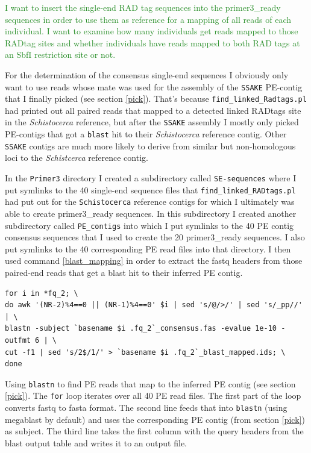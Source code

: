 \documentclass{article}\usepackage[]{graphicx}\usepackage[]{color}
\newcommand{\roger}[1]{ \textcolor[named]{ForestGreen}{#1} }
\begin{document}
\roger{I want to insert the single-end RAD tag sequences into the primer3\_ready sequences in order to use them as reference for a mapping of all reads of each individual. I want to examine how many individuals get reads mapped to those RADtag sites and whether individuals have reads mapped to both RAD tags at an SbfI restriction site or not. }

For the determination of the consensus single-end sequences I obviously only want to use reads whose mate was used for the assembly of the \texttt{SSAKE} PE-contig that I finally picked (see section \ref{pick}). That's because \texttt{find\_linked\_Radtags.pl} had printed out all paired reads that mapped to a detected linked RADtags site in the \textit{Schistocerca} reference, but after the \texttt{SSAKE} assembly I mostly only picked PE-contigs that got a \texttt{blast} hit to their \textit{Schistocerca} reference contig. Other \texttt{SSAKE} contigs are much more likely to derive from similar but non-homologous loci to the \textit{Schistcerca} reference contig.

In the \texttt{Primer3} directory I created a subdirectory called \texttt{SE-sequences} where I put symlinks to the 40 single-end sequence files that \texttt{find\_linked\_RADtags.pl} had put out for the \texttt{Schistocerca} reference contigs for which I ultimately was able to create primer3\_ready sequences. In this subdirectory I created another subdirectory called \texttt{PE\_contigs} into which I put symlinks to the 40 PE contig consensus sequences that I used to create the 20 primer3\_ready sequences. I also put symlinks to the 40 corresponding PE read files into that directory. I then used command \ref{blast_mapping} in order to extract the fastq headers from those paired-end reads that get a blast hit to their inferred PE contig.

\begin{command}
\captionsetup{type=command}
\begin{Verbatim}
for i in *fq_2; \
do awk '(NR-2)%4==0 || (NR-1)%4==0' $i | sed 's/@/>/' | sed 's/_pp//' | \
blastn -subject `basename $i .fq_2`_consensus.fas -evalue 1e-10 -outfmt 6 | \
cut -f1 | sed 's/2$/1/' > `basename $i .fq_2`_blast_mapped.ids; \
done
\end{Verbatim}
\caption{\small Using \texttt{blastn} to find PE reads that map to the inferred PE contig (see section \ref{pick}). The \texttt{for} loop iterates over all 40 PE read files. The first part of the loop converts fastq to fasta format. The second line feeds that into \texttt{blastn} (using megablast by default) and uses the corresponding PE contig (from section \ref{pick}) as subject. The third line takes the first column with the query headers from the blast output table and writes it to an output file.
}
\label{blast_mapping} 
\end{command}
\end{document}
